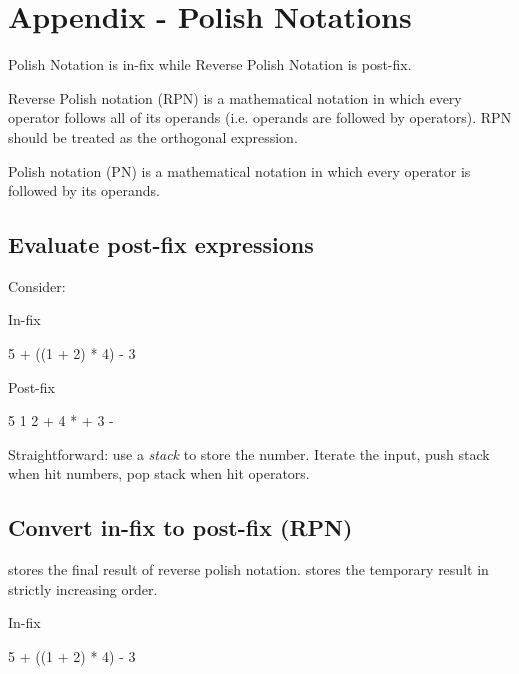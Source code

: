 \section{Appendix - Polish Notations}
Polish Notation is in-fix while Reverse Polish Notation is post-fix. 

Reverse Polish notation (RPN) is a mathematical notation in which every operator follows all of its operands (i.e. operands are followed by operators). RPN should be treated as the orthogonal expression.  

Polish notation (PN) is a mathematical notation in which every operator is followed by its operands. 
\subsection{Evaluate post-fix expressions}\label{section:evaluationPostFix}
Consider: 

In-fix
\begin{python}
5 + ((1 + 2) * 4) - 3
\end{python}

Post-fix
\begin{python}
5 1 2 + 4 * + 3 - 
\end{python}
Straightforward: use a \textit{stack} to store the number. Iterate the input, push
stack when hit numbers, pop stack when hit operators.
\subsection{Convert in-fix to post-fix (RPN)}
 stores the final result of reverse polish notation.  stores
the temporary result in strictly increasing order. 

In-fix
\begin{python}
5 + ((1 + 2) * 4) - 3
\end{python}

